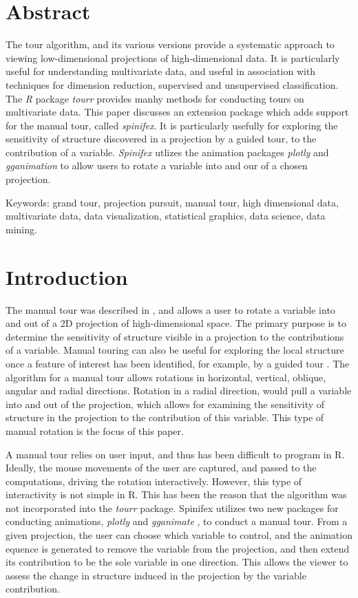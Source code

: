 \documentclass{monashthesis}
\begin{document}
\section{Abstract}\label{abstract-1}

The tour algorithm, and its various versions provide a systematic
approach to viewing low-dimensional projections of high-dimensional
data. It is particularly useful for understanding multivariate data, and
useful in association with techniques for dimension reduction,
supervised and unsupervised classification. The \emph{R} package
\emph{tourr} provides manhy methods for conducting tours on multivariate
data. This paper discusses an extension package which adds support for
the manual tour, called \emph{spinifex}. It is particularly usefully for
exploring the sensitivity of structure discovered in a projection by a
guided tour, to the contribution of a variable. \emph{Spinifex} utlizes
the animation packages \emph{plotly} and \emph{gganimation} to allow
users to rotate a variable into and our of a chosen projection.

Keywords: grand tour, projection pursuit, manual tour, high dimensional
data, multivariate data, data visualization, statistical graphics, data
science, data mining.

\section{Introduction}\label{introduction}

The manual tour was described in \textcite{cook_manual_1997}, and allows
a user to rotate a variable into and out of a 2D projection of
high-dimensional space. The primary purpose is to determine the
sensitivity of structure visible in a projection to the contributions of
a variable. Manual touring can also be useful for exploring the local
structure once a feature of interest has been identified, for example,
by a guided tour \autocite{cook_grand_1995}. The algorithm for a manual
tour allows rotations in horizontal, vertical, oblique, angular and
radial directions. Rotation in a radial direction, would pull a variable
into and out of the projection, which allows for examining the
sensitivity of structure in the projection to the contribution of this
variable. This type of manual rotation is the focus of this paper.

A manual tour relies on user input, and thus has been difficult to
program in R. Ideally, the mouse movements of the user are captured, and
passed to the computations, driving the rotation interactively. However,
this type of interactivity is not simple in R. This has been the reason
that the algorithm was not incorporated into the \emph{tourr} package.
Spinifex utilizes two new packages for conducting animations,
\emph{plotly} \autocite{sievert_plotly_2018} and \emph{gganimate}
\autocite{pedersen_gganimate:_2019}, to conduct a manual tour. From a
given projection, the user can choose which variable to control, and the
animation equence is generated to remove the variable from the
projection, and then extend its contribution to be the sole variable in
one direction. This allows the viewer to assess the change in structure
induced in the projection by the variable contribution.
\end{document}
